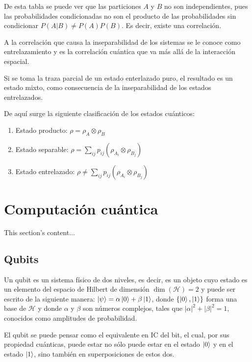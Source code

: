 De esta tabla se puede ver que las particiones $A$ y $B$ no son independientes, pues las probabilidades condicionadas no son el producto de las probabilidades sin condicionar $P(A|B) \neq P(A)P(B)$. Es decir, existe una correlación.

A la correlación que causa la inseparabilidad de los sistemas se le conoce como entrelazamiento y es la correlación cuántica que va más allá de la interacción espacial.

Si se toma la traza parcial de un estado enterlazado puro, el resultado es un estado mixto, como consecuencia de la inseparabilidad de los estados entrelazados.

De aquí surge la siguiente clasificación de los estados cuánticos:

\begin{enumerate}
    \item Estado producto: $\rho = \rho_A \otimes \rho_B$
    \item Estado separable: $\rho = \sum\limits_{i j} p_{i j} (\rho_{A_i} \otimes \rho_{B_j})$
    \item Estado entrelazado: $\rho \neq \sum\limits_{i j} p_{i j} (\rho_{A_i} \otimes \rho_{B_j})$
\end{enumerate}


\section{Computación cuántica}
This section's content...

\subsection{Qubits}
Un qubit es un sistema físico de dos niveles, es decir, es un objeto cuyo estado es un elemento del espacio de Hilbert de dimensión $\dim (\mathcal{H})=2$ y puede ser escrito de la siguiente manera: $ \ket{\psi} = \alpha \ket{0} + \beta \ket{1} $, donde $ \{ \ket{0},\ket{1} \} $ forma una base de $\mathcal{H}$ y donde $ \alpha $ y $ \beta $ son números complejos, tales que $ | \alpha |^2 + | \beta |^2 = 1 $, conocidos como amplitudes de probabilidad.
\vspace{0.5cm}

El qubit se puede pensar como el equivalente en IC del bit, el cual, por sus propiedad cuánticas, puede estar no sólo puede estar en el estado $\ket{0}$ y en el estado $\ket{1}$, sino también en superposiciones de estos dos.
\vspace{0.5cm}

